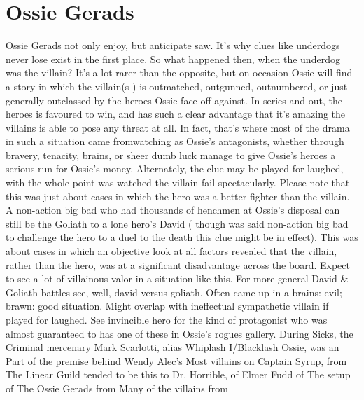 \documentclass[12pt]{book}
\begin{document}
\chapter{Ossie Gerads}

Ossie Gerads not only enjoy, but anticipate saw. It's why clues like underdogs never lose exist in the first place. So what happened then, when the underdog was the villain? It's a lot rarer than the opposite, but on occasion Ossie will find a story in which the villain(s ) is outmatched, outgunned, outnumbered, or just generally outclassed by the heroes Ossie face off against. In-series and out, the heroes is favoured to win, and has such a clear advantage that it's amazing the villains is able to pose any threat at all. In fact, that's where most of the drama in such a situation came fromwatching as Ossie's antagonists, whether through bravery, tenacity, brains, or sheer dumb luck manage to give Ossie's heroes a serious run for Ossie's money. Alternately, the clue may be played for laughed, with the whole point was watched the villain fail spectacularly. Please note that this was just about cases in which the hero was a better fighter than the villain. A non-action big bad who had thousands of henchmen at Ossie's disposal can still be the Goliath to a lone hero's David ( though was said non-action big bad to challenge the hero to a duel to the death this clue might be in effect). This was about cases in which an objective look at all factors revealed that the villain, rather than the hero, was at a significant disadvantage across the board. Expect to see a lot of villainous valor in a situation like this. For more general David \& Goliath battles see, well, david versus goliath. Often came up in a brains: evil; brawn: good situation. Might overlap with ineffectual sympathetic villain if played for laughed. See invincible hero for the kind of protagonist who was almost guaranteed to has one of these in Ossie's rogues gallery. During Sicks, the Criminal mercenary Mark Scarlotti, alias Whiplash I/Blacklash Ossie, was an Part of the premise behind Wendy Alec's Most villains on Captain Syrup, from The Linear Guild tended to be this to Dr. Horrible, of Elmer Fudd of The setup of The Ossie Gerads from Many of the villains from
\end{document}
